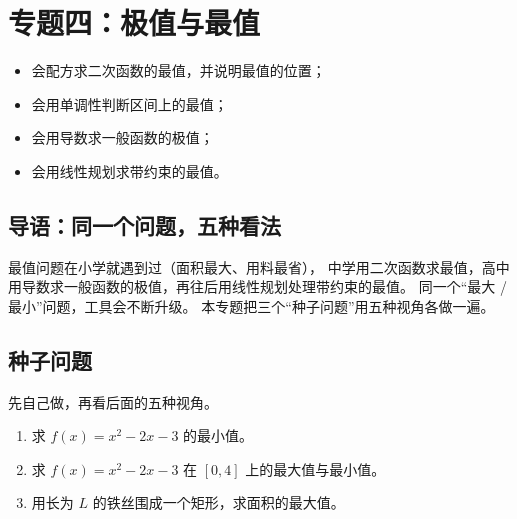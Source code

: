 \section{专题四：极值与最值}

\begin{learnobjective}
\begin{itemize}
  \item 会配方求二次函数的最值，并说明最值的位置；
  \item 会用单调性判断区间上的最值；
  \item 会用导数求一般函数的极值；
  \item 会用线性规划求带约束的最值。
\end{itemize}
\end{learnobjective}

\begin{preview}
\subsection{导语：同一个问题，五种看法}
最值问题在小学就遇到过（面积最大、用料最省），
中学用二次函数求最值，高中用导数求一般函数的极值，再往后用线性规划处理带约束的最值。
同一个“最大 / 最小”问题，工具会不断升级。
本专题把三个“种子问题”用五种视角各做一遍。

\subsection{种子问题}
先自己做，再看后面的五种视角。
\begin{enumerate}
  \item 求 $f(x)=x^2-2x-3$ 的最小值。
  \item 求 $f(x)=x^2-2x-3$ 在 $[0,4]$ 上的最大值与最小值。
  \item 用长为 $L$ 的铁丝围成一个矩形，求面积的最大值。
\end{enumerate}
\end{preview}

